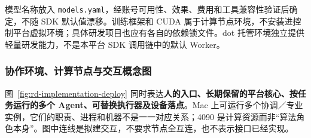 \documentclass[11pt,a4paper]{article}
\begin{document}
模型名称放入 \texttt{models.yaml}，经账号可用性、效果、费用和工具兼容性验证后确定，不随 SDK 默认值漂移。训练框架和 CUDA 属于计算节点环境，不安装进控制平台虚拟环境；具体研发项目也应有各自的依赖锁文件。dot 托管环境独立提供轻量研发能力，不是本平台 SDK 调用链中的默认 Worker。

\Needspace{22cm}
\subsubsection{协作环境、计算节点与交互概念图}

图~\ref{fig:rd-implementation-deploy} 同时表达\textbf{人的入口、长期保留的平台核心、按任务运行的多个 Agent、可替换执行器及设备落点}。Mac 上可运行多个协调／专业实例，它们的职责、进程和机器不是一一对应关系；4090 是计算资源而非“算法角色本身”。图中连线是拟建交互，不要求节点全互连，也不表示接口已经实现。
\end{document}
